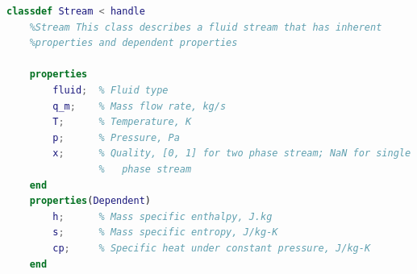 \begin{lstlisting}[language= MATLAB, backgroundcolor = \color{yellow!20}, label = {lst:MATLAB_SOURCECODE}]
classdef Stream < handle
    %Stream This class describes a fluid stream that has inherent
    %properties and dependent properties
    
    properties
        fluid;  % Fluid type
        q_m;    % Mass flow rate, kg/s
        T;      % Temperature, K
        p;      % Pressure, Pa
        x;      % Quality, [0, 1] for two phase stream; NaN for single 
                %   phase stream
    end
    properties(Dependent)
        h;      % Mass specific enthalpy, J.kg
        s;      % Mass specific entropy, J/kg-K
        cp;     % Specific heat under constant pressure, J/kg-K
    end
    

\end{lstlisting}
